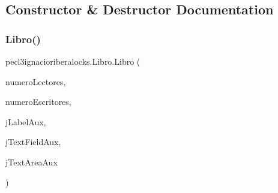 \subsection{Constructor \& Destructor Documentation}
\mbox{\label{classpecl3ignacioriberalocks_1_1_libro_a7ce0e58867b29af5aaf169c04e86f0c4}} 
\subsubsection{\texorpdfstring{Libro()}{Libro()}}
{\footnotesize\ttfamily pecl3ignacioriberalocks.\+Libro.\+Libro (\begin{DoxyParamCaption}\item[{int}]{numero\+Lectores,  }\item[{int}]{numero\+Escritores,  }\item[{javax.\+swing.\+J\+Label}]{j\+Label\+Aux,  }\item[{javax.\+swing.\+J\+Text\+Field}]{j\+Text\+Field\+Aux,  }\item[{javax.\+swing.\+J\+Text\+Area}]{j\+Text\+Area\+Aux }\end{DoxyParamCaption})\hspace{0.3cm}{\ttfamily [inline]}}



